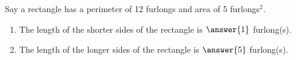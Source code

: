 \documentclass{ximera}
\author{Kenneth Berglund}
\begin{document}
\begin{exercise}
Say a rectangle has a perimeter of 12 furlongs and area of 5 furlongs$^2$.  

\begin{enumerate}
\item The length of the shorter sides of the rectangle is $\answer{1}$ furlong(s).
\item The length of the longer sides of the rectangle is $\answer{5}$ furlong(s).
\end{enumerate}

\end{exercise}
\end{document}
